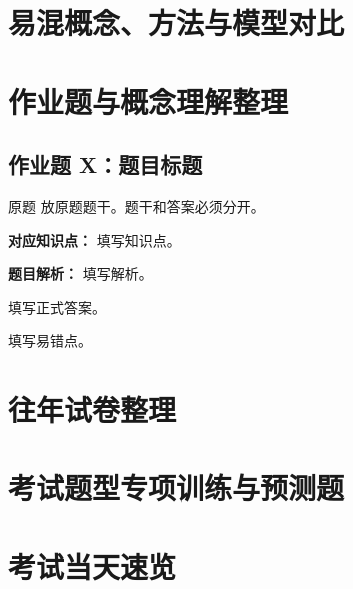 \documentclass[12pt,a4paper]{ctexart}
\newcommand{\examfield}[1]{\par\smallskip\noindent\textbf{#1：}}
\begin{document}
\section{易混概念、方法与模型对比}

\section{作业题与概念理解整理}

\subsection*{作业题 X：题目标题}

\begin{questionbox}{原题}
放原题题干。题干和答案必须分开。
\end{questionbox}

\examfield{对应知识点}
填写知识点。

\examfield{题目解析}
填写解析。

\begin{answerbox}
填写正式答案。
\end{answerbox}

\begin{warningbox}
填写易错点。
\end{warningbox}

\section{往年试卷整理}

\section{考试题型专项训练与预测题}


\section{考试当天速览}

\end{document}
